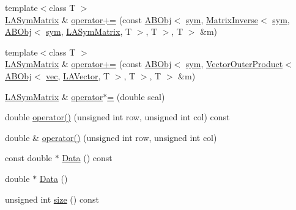 \begin{DoxyCompactItemize}
{\footnotesize template$<$class T $>$ }\\\mbox{\hyperlink{classROOT_1_1Minuit2_1_1LASymMatrix}{L\+A\+Sym\+Matrix}} \& \mbox{\hyperlink{classROOT_1_1Minuit2_1_1LASymMatrix_a57fe61819895d7ff65c48767eb5b282e}{operator+=}} (const \mbox{\hyperlink{classROOT_1_1Minuit2_1_1ABObj}{A\+B\+Obj}}$<$ \mbox{\hyperlink{classROOT_1_1Minuit2_1_1sym}{sym}}, \mbox{\hyperlink{classROOT_1_1Minuit2_1_1MatrixInverse}{Matrix\+Inverse}}$<$ \mbox{\hyperlink{classROOT_1_1Minuit2_1_1sym}{sym}}, \mbox{\hyperlink{classROOT_1_1Minuit2_1_1ABObj}{A\+B\+Obj}}$<$ \mbox{\hyperlink{classROOT_1_1Minuit2_1_1sym}{sym}}, \mbox{\hyperlink{classROOT_1_1Minuit2_1_1LASymMatrix}{L\+A\+Sym\+Matrix}}, T $>$, T $>$, T $>$ \&m)
\item 
{\footnotesize template$<$class T $>$ }\\\mbox{\hyperlink{classROOT_1_1Minuit2_1_1LASymMatrix}{L\+A\+Sym\+Matrix}} \& \mbox{\hyperlink{classROOT_1_1Minuit2_1_1LASymMatrix_a2d453653e316685b846ddeb299708f3d}{operator+=}} (const \mbox{\hyperlink{classROOT_1_1Minuit2_1_1ABObj}{A\+B\+Obj}}$<$ \mbox{\hyperlink{classROOT_1_1Minuit2_1_1sym}{sym}}, \mbox{\hyperlink{classROOT_1_1Minuit2_1_1VectorOuterProduct}{Vector\+Outer\+Product}}$<$ \mbox{\hyperlink{classROOT_1_1Minuit2_1_1ABObj}{A\+B\+Obj}}$<$ \mbox{\hyperlink{classROOT_1_1Minuit2_1_1vec}{vec}}, \mbox{\hyperlink{classROOT_1_1Minuit2_1_1LAVector}{L\+A\+Vector}}, T $>$, T $>$, T $>$ \&m)
\item 
\mbox{\hyperlink{classROOT_1_1Minuit2_1_1LASymMatrix}{L\+A\+Sym\+Matrix}} \& \mbox{\hyperlink{classROOT_1_1Minuit2_1_1LASymMatrix_abb10e4e092df8072bf59de3a0880b336}{operator$\ast$=}} (double scal)
\item 
double \mbox{\hyperlink{classROOT_1_1Minuit2_1_1LASymMatrix_a3a1a954a9e1ab78f255146ccd76d3847}{operator()}} (unsigned int row, unsigned int col) const
\item 
double \& \mbox{\hyperlink{classROOT_1_1Minuit2_1_1LASymMatrix_a580d204fdc526218483e7b2e276da265}{operator()}} (unsigned int row, unsigned int col)
\item 
const double $\ast$ \mbox{\hyperlink{classROOT_1_1Minuit2_1_1LASymMatrix_ab1fb932a4ad517108a3b58473b6d8803}{Data}} () const
\item 
double $\ast$ \mbox{\hyperlink{classROOT_1_1Minuit2_1_1LASymMatrix_abb2b699b82e6aa2803d01e16683433eb}{Data}} ()
\item 
unsigned int \mbox{\hyperlink{classROOT_1_1Minuit2_1_1LASymMatrix_af924c1e0eb1578716a8cb8940cc08563}{size}} () const
\item 

\end{DoxyCompactItemize}
